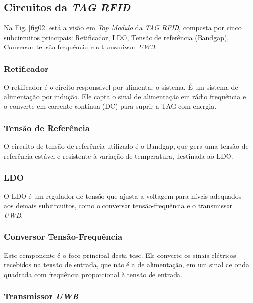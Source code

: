 \subsection{Circuitos da \textit{TAG RFID}}

Na Fig. \ref{fig02} está a visão em \textit{Top Modulo} da \textit{TAG RFID}, composta por cinco subcircuitos principais: Retificador, LDO, Tensão de referência (Bandgap), Conversor tensão frequência e o transmissor \textit{UWB}.

\subsubsection{Retificador}

O retificador é o circito responsável por alimentar o sistema. É um sistema de alimentação por indução. Ele capta o sinal de alimentação em rádio frequência e o converte em corrente contínua (DC) para suprir a TAG com energia.

\subsubsection{Tensão de Referência}

O circuito de tensão de referência utilizado é o Bandgap, que gera uma tensão de referência estável e resistente à variação de temperatura, destinada ao LDO.

\subsubsection{LDO}

O LDO é um regulador de tensão que ajusta a voltagem para níveis adequados aos demais subcircuitos, como o conversor tensão-frequência e o transmissor \textit{UWB}.

\subsubsection{Conversor Tensão-Frequência}

Este componente é o foco principal desta tese. Ele converte os sinais elétricos recebidos na tensão de entrada, que não é a de alimentação, em um sinal de onda quadrada com frequência proporcional à tensão de entrada.

\subsubsection{Transmissor \textit{UWB}}

